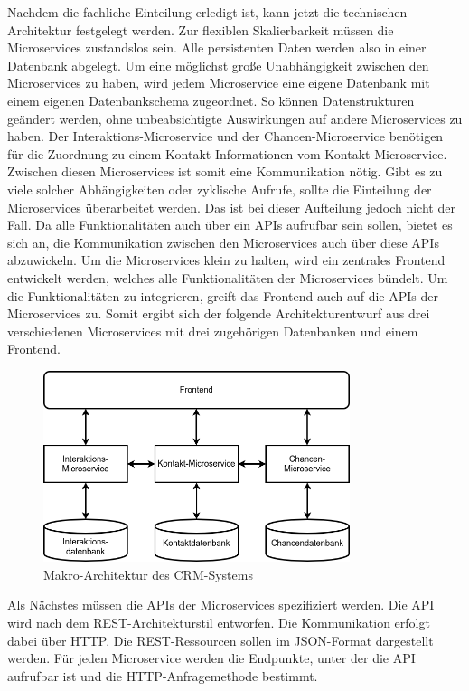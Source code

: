 Nachdem die fachliche Einteilung erledigt ist, kann jetzt die technischen Architektur festgelegt werden. Zur flexiblen Skalierbarkeit müssen die Microservices zustandslos sein. Alle persistenten Daten werden also in einer Datenbank abgelegt. Um eine möglichst große Unabhängigkeit zwischen den Microservices zu haben, wird jedem Microservice eine eigene Datenbank mit einem eigenen Datenbankschema zugeordnet. So können Datenstrukturen geändert werden, ohne unbeabsichtigte Auswirkungen auf andere Microservices zu haben. Der Interaktions-Microservice und der Chancen-Microservice benötigen für die Zuordnung zu einem Kontakt Informationen vom Kontakt-Microservice. Zwischen diesen Microservices ist somit eine Kommunikation nötig. Gibt es zu viele solcher Abhängigkeiten oder zyklische Aufrufe, sollte die Einteilung der Microservices überarbeitet werden. Das ist bei dieser Aufteilung jedoch nicht der Fall. Da alle Funktionalitäten auch über ein \acp{API} aufrufbar sein sollen, bietet es sich an, die Kommunikation zwischen den Microservices auch über diese \acp{API} abzuwickeln. Um die Microservices klein zu halten, wird ein zentrales Frontend entwickelt werden, welches alle Funktionalitäten der Microservices bündelt. Um die Funktionalitäten zu integrieren, greift das Frontend auch auf die \acp{API} der Microservices zu. Somit ergibt sich der folgende Architekturentwurf aus drei verschiedenen Microservices mit drei zugehörigen Datenbanken und einem Frontend.

\begin{figure}[H] 
    \centering
    \includegraphics[width=0.8\textwidth]{figures/CRMEntwurf.png}
    \caption{Makro-Architektur des CRM-Systems}
\end{figure}

Als Nächstes müssen die \acp{API} der Microservices spezifiziert werden. Die \ac{API} wird nach dem \ac{REST}-Architekturstil entworfen. Die Kommunikation erfolgt dabei über \ac{HTTP}. Die \ac{REST}-Ressourcen sollen im \ac{JSON}-Format dargestellt werden. Für jeden Microservice werden die Endpunkte, unter der die \ac{API} aufrufbar ist und die HTTP-Anfragemethode bestimmt.


